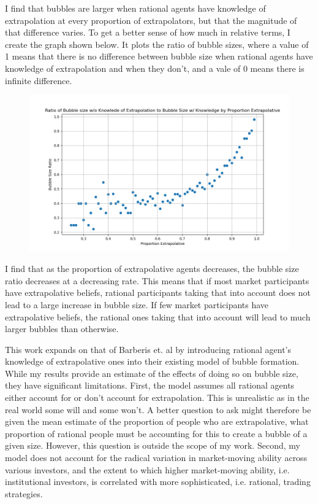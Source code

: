 \documentclass[10pt,twocolumn]{article}
\begin{document}
I find that bubbles are larger when rational agents have knowledge of extrapolation at every proportion of extrapolators, but that the magnitude of that difference varies. To get a better sense of how much in relative terms, I create the graph shown below. It plots the ratio of bubble sizes, where a value of 1 means that there is no difference between bubble size when rational agents have knowledge of extrapolation and when they don't, and a vale of 0 means there is infinite difference. 

\begin{figure}[H]
    \centering
    \includegraphics[width=0.8\linewidth]{images/bubbles4.png}
    \label{fig:enter-label}
\end{figure}

I find that as the proportion of extrapolative agents decreases, the bubble size ratio decreases at a decreasing rate. This means that if most market participants have extrapolative beliefs, rational participants taking that into account does not lead to a large increase in bubble size. If few market participants have extrapolative beliefs, the rational ones taking that into account will lead to much larger bubbles than otherwise. 

This work expands on that of Barberis et. al\cite{BarberisEtAl} by introducing rational agent's knowledge of extrapolative ones into their existing model of bubble formation. While my results provide an estimate of the effects of doing so on bubble size, they have significant limitations. First, the model assumes all rational agents either account for or don't account for extrapolation. This is unrealistic as in the real world some will and some won't. A better question to ask might therefore be given the mean estimate of the proportion of people who are extrapolative, what proportion of rational people must be accounting for this to create a bubble of a given size. However, this question is outside the scope of my work. Second, my model does not account for the radical variation in market-moving ability across various investors, and the extent to which higher market-moving ability, i.e. institutional investors, is correlated with more sophisticated, i.e. rational, trading strategies. 
\end{document}
